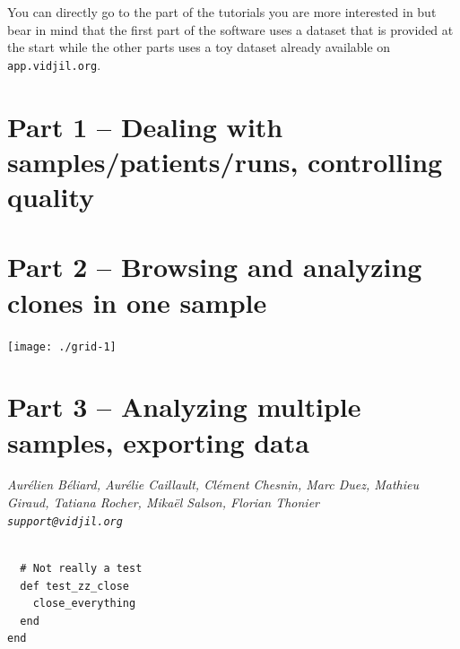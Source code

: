 \documentclass[11pt]{report}
\begin{document}
You can directly go to the part of the tutorials you are more interested in
but bear in mind
that the first part of the software uses a dataset that is
provided at the start
while the other parts uses a toy dataset
already available on \texttt{app.vidjil.org}.

\tableofcontents


\chapter{Part 1 -- Dealing with samples/patients/runs, controlling quality
}






\chapter{Part 2 --  Browsing and analyzing clones in one sample}

\bigskip





\bigskip

\bigskip

\centerline{\texttt{[image: ./grid-1]}}

\newpage

\chapter{Part 3 -- Analyzing multiple samples, exporting data}





\vfill
\flushright \it Aurélien Béliard, Aurélie Caillault, Clément Chesnin, Marc Duez, Mathieu Giraud, Tatiana Rocher, Mikaël Salson, Florian Thonier
\\ \texttt{support@vidjil.org}


\begin{verbatim}

  # Not really a test
  def test_zz_close
    close_everything
  end
end
\end{verbatim}
\end{document}
